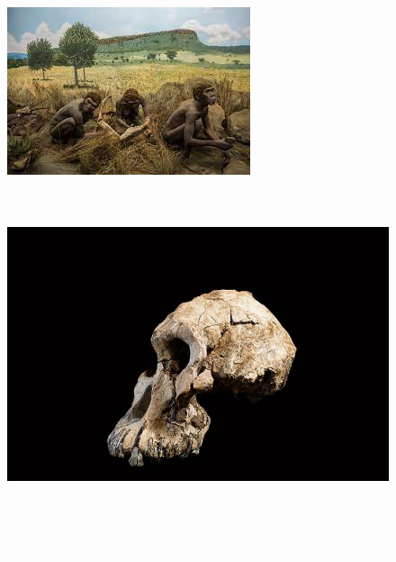 \documentclass[aspectratio=169]{beamer} %
\begin{document}
{\begin{frame}
    \begin{minipage}{0.5\textwidth}
	    \begin{figure}
	\centering
        \includegraphics[scale=0.5]{images/australopitecus5.jpeg} %
		    \caption{\textcolor{white}{\textit{ Australopithecus anamensis}, fornece evidências sólidas do bipedismo a cerca de 3.9 Ma, na atual Etiópia.}} %
	    \end{figure}
    \end{minipage}%
		\pause
    \begin{minipage}{0.5\textwidth}
	    \begin{figure}
        \centering
        \includegraphics[scale=0.2]{images/australopitecus2.jpg} %
		    \caption{\textcolor{white}{Apesar de possuir andar bípede, eles tiveram braços longos. A relação do osso de braço superior (úmero) para osso de perna superior (fêmur) e está virtualmente igual ao de um Chimpanzé ($95\%$) do que um humano moderno ( $70\%$.) }} %
	    \end{figure}
    \end{minipage}

\flushright
		\textcolor{blue}{\citep{Higham2011}}
		
	\end{frame}
}
\end{document}
